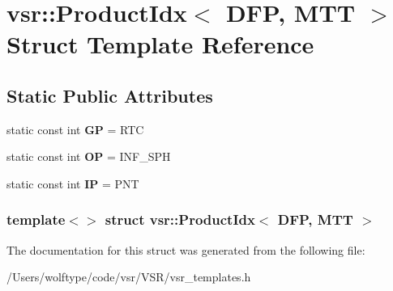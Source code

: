 \hypertarget{structvsr_1_1_product_idx_3_01_d_f_p_00_01_m_t_t_01_4}{\section{vsr\-:\-:Product\-Idx$<$ D\-F\-P, M\-T\-T $>$ Struct Template Reference}
\label{structvsr_1_1_product_idx_3_01_d_f_p_00_01_m_t_t_01_4}
}
\subsection*{Static Public Attributes}
\begin{DoxyCompactItemize}
\item 
\hypertarget{structvsr_1_1_product_idx_3_01_d_f_p_00_01_m_t_t_01_4_a272a1c58e1435011a87181c5c822e864}{static const int {\bfseries G\-P} = R\-T\-C}\label{structvsr_1_1_product_idx_3_01_d_f_p_00_01_m_t_t_01_4_a272a1c58e1435011a87181c5c822e864}

\item 
\hypertarget{structvsr_1_1_product_idx_3_01_d_f_p_00_01_m_t_t_01_4_a497b2855fdfdf31395b62458c861e6e9}{static const int {\bfseries O\-P} = I\-N\-F\-\_\-\-S\-P\-H}\label{structvsr_1_1_product_idx_3_01_d_f_p_00_01_m_t_t_01_4_a497b2855fdfdf31395b62458c861e6e9}

\item 
\hypertarget{structvsr_1_1_product_idx_3_01_d_f_p_00_01_m_t_t_01_4_ac6375980e6994f2aa9785ae61154529e}{static const int {\bfseries I\-P} = P\-N\-T}\label{structvsr_1_1_product_idx_3_01_d_f_p_00_01_m_t_t_01_4_ac6375980e6994f2aa9785ae61154529e}

\end{DoxyCompactItemize}
\subsubsection*{template$<$$>$ struct vsr\-::\-Product\-Idx$<$ D\-F\-P, M\-T\-T $>$}



The documentation for this struct was generated from the following file\-:\begin{DoxyCompactItemize}
\item 
/\-Users/wolftype/code/vsr/\-V\-S\-R/vsr\-\_\-templates.\-h\end{DoxyCompactItemize}
